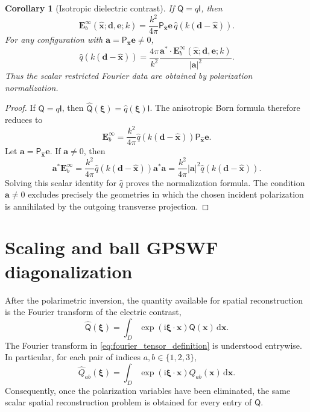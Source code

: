 \documentclass[11pt]{article}
\numberwithin{equation}{section}
\newcommand{\ii}{\mathrm{i}}
\newcommand{\dd}{\,\mathrm d}
\newcommand{\vect}[1]{\bm{#1}}
\newcommand{\tens}[1]{\bm{\mathsf{#1}}}
\newcommand{\Id}{\ensuremath{\tens{I}}}
\newcommand{\Qt}{\ensuremath{\tens{Q}}}
\newcommand{\abs}[1]{\left\lvert #1\right\rvert}
\theoremstyle{plain}
\newtheorem{corollary}[theorem]{Corollary}
\theoremstyle{definition}
\begin{document}
\begin{corollary}[Isotropic dielectric contrast]\label{cor:isotropic}
If $\Qt=q\Id$, then
\begin{equation*}
  \vect{E}_b^\infty(\hat{\vect{x}};\vect{d},\vect{e};k)=\frac{k^2}{4\pi}\tens{P}_{\hat{\vect{x}}}\vect{e}\,\widehat q(k(\vect{d}-\hat{\vect{x}})).
\end{equation*}
For any configuration with $\vect{a}=\tens{P}_{\hat{\vect{x}}}\vect{e}\ne0$,
\begin{equation*}
  \widehat q(k(\vect{d}-\hat{\vect{x}}))
  =\frac{4\pi}{k^2}\frac{\vect{a}^*\cdot \vect{E}_b^\infty(\hat{\vect{x}};\vect{d},\vect{e};k)}{\abs{\vect{a}}^2}.
\end{equation*}
Thus the scalar restricted Fourier data are obtained by polarization normalization.
\end{corollary}

\begin{proof}
If \(\Qt=q\Id\), then \(\widehat{\Qt}(\vect{\xi})=\widehat q(\vect{\xi})\Id\).  The anisotropic Born formula therefore reduces to
\[
  \vect{E}_b^\infty
  =\frac{k^2}{4\pi}\widehat q(k(\vect{d}-\hat{\vect{x}}))\tens{P}_{\hat{\vect{x}}}\vect{e} .
\]
Let \(\vect{a}=\tens{P}_{\hat{\vect{x}}}\vect{e}\).  If \(\vect{a}\ne0\), then
\[
  \vect{a}^*\vect{E}_b^\infty
  =\frac{k^2}{4\pi}\widehat q(k(\vect{d}-\hat{\vect{x}}))\vect{a}^*\vect{a}
  =\frac{k^2}{4\pi}\abs{\vect{a}}^2\widehat q(k(\vect{d}-\hat{\vect{x}})).
\]
Solving this scalar identity for \(\widehat q\) proves the normalization formula.  The condition \(\vect{a}\ne0\) excludes precisely the geometries in which the chosen incident polarization is annihilated by the outgoing transverse projection.
\end{proof}

\section{Scaling and ball GPSWF diagonalization}\label{sec:gpswf}

After the polarimetric inversion, the quantity available for spatial
reconstruction is the Fourier transform of the electric contrast,
\begin{equation}\label{eq:fourier_tensor_definition}
  \widehat{\Qt}(\vect{\xi})
  =
  \int_D
  \exp(\ii\vect{\xi}\cdot\vect{x})
  \Qt(\vect{x})
  \dd\vect{x}.
\end{equation}
The Fourier transform in \eqref{eq:fourier_tensor_definition} is understood
entrywise.  In particular, for each pair of indices \(a,b\in\{1,2,3\}\),
\begin{equation*}
  \widehat{Q}_{ab}(\vect{\xi})
  =
  \int_D
  \exp(\ii\vect{\xi}\cdot\vect{x})
  Q_{ab}(\vect{x})
  \dd\vect{x}.
\end{equation*}
Consequently, once the polarization variables have been eliminated, the same
scalar spatial reconstruction problem is obtained for every entry of
\(\Qt\).
\end{document}

